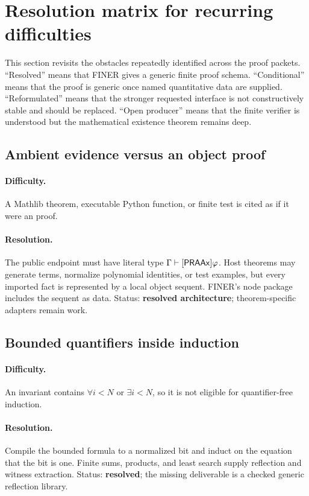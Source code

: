 \section{Resolution matrix for recurring difficulties}
\label{sec:difficulties}

This section revisits the obstacles repeatedly identified across the proof packets.  ``Resolved'' means that FINER gives a generic finite proof schema.  ``Conditional'' means that the proof is generic once named quantitative data are supplied.  ``Reformulated'' means that the stronger requested interface is not constructively stable and should be replaced.  ``Open producer'' means that the finite verifier is understood but the mathematical existence theorem remains deep.

\subsection{Ambient evidence versus an object proof}

\paragraph{Difficulty.}
A Mathlib theorem, executable Python function, or finite test is cited as if it were an \iPRA{} proof.

\paragraph{Resolution.}
The public endpoint must have literal type \(\Gamma\vdash[\mathsf{PRAAx}]\varphi\).  Host theorems may generate terms, normalize polynomial identities, or test examples, but every imported fact is represented by a local object sequent.  FINER's node package includes the sequent as data.  Status: \textbf{resolved architecture}; theorem-specific adapters remain work.

\subsection{Bounded quantifiers inside induction}

\paragraph{Difficulty.}
An invariant contains \(\forall i<N\) or \(\exists i<N\), so it is not eligible for quantifier-free induction.

\paragraph{Resolution.}
Compile the bounded formula to a normalized bit and induct on the equation that the bit is one.  Finite sums, products, and least search supply reflection and witness extraction.  Status: \textbf{resolved}; the missing deliverable is a checked generic reflection library.

